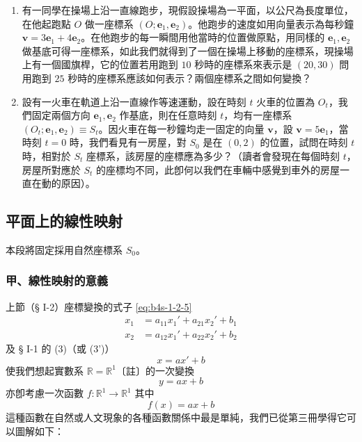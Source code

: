 \begin{enumerate}
  \item 有一同學在操場上沿一直線跑步，現假設操場為一平面，以公尺為長度單位，在他起跑點 $O$ 做一座標系 $(O; \mathbf{e}_1, \mathbf{e}_2)$。他跑步的速度如用向量表示為每秒鐘 $\mathbf{v} = 3\mathbf{e}_1 + 4\mathbf{e}_2$。在他跑步的每一瞬間用他當時的位置做原點，用同樣的 $\mathbf{e}_1, \mathbf{e}_2$ 做基底可得一座標系，如此我們就得到了一個在操場上移動的座標系，現操場上有一個國旗桿，它的位置若用跑到 $10$ 秒時的座標系來表示是 $(20, 30)$ 問用跑到 $25$ 秒時的座標系應該如何表示？兩個座標系之間如何變換？

  \item 設有一火車在軌道上沿一直線作等速運動，設在時刻 $t$ 火車的位置為 $O_t$，我們固定兩個方向 $\mathbf{e}_1, \mathbf{e}_2$ 作基底，則在任意時刻 $t$，均有一座標系 $(O_t; \mathbf{e}_1, \mathbf{e}_2) \equiv S_t$。因火車在每一秒鐘均走一固定的向量 $\mathbf{v}$，設 $\mathbf{v} = 5\mathbf{e}_1$，當時刻 $t = 0$ 時，我們看見有一房屋，對 $S_0$ 是在 $(0, 2)$ 的位置，試問在時刻 $t$ 時，相對於 $S_t$ 座標系，該房屋的座標應為多少？（讀者會發現在每個時刻 $t$，房屋所對應於 $S_t$ 的座標均不同，此卽何以我們在車輛中感覺到車外的房屋一直在動的原因）。
\end{enumerate}
\subsection{平面上的線性映射}
\label{sec:b4s-1-3}

本段將固定採用自然座標系 $S_0$。

\subsubsection*{甲、線性映射的意義}

上節（§ I-2）座標變換的式子 \eqref{eq:b4s-1-2-5}
\begin{align*}
x_1 &= a_{11}x_1' + a_{21}x_2' + b_1 \\
x_2 &= a_{12}x_1' + a_{22}x_2' + b_2
\end{align*}
及 § I-1 的 (3)（或 (3')）
\[ x = ax' + b \]
使我們想起實數系 $\mathbb{R} = \mathbb{R}^1$〔註〕的一次變換
\begin{equation}
y = ax + b \label{eq:b4s-1-3-1}
\end{equation}
亦卽考慮一次函數 $f: \mathbb{R}^1 \to \mathbb{R}^1$ 其中
\begin{equation}
f(x) = ax + b \label{eq:b4s-1-3-2}
\end{equation}
這種函數在自然或人文現象的各種函數關係中最是單純，我們已從第三冊學得它可以圖解如下：

